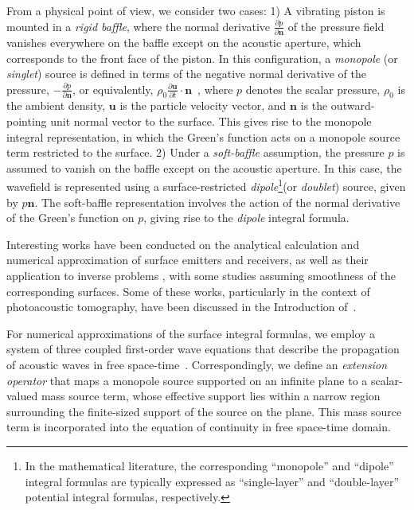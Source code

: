 \documentclass[11pt,reqno]{amsart}
\theoremstyle{remark}
\theoremstyle{italic_lemma}
\newcommand{\bu}{\boldsymbol{u}}
\newcommand{\bn}{\boldsymbol{n}}
\begin{document}
From a physical point of view, we consider two cases: 1) A vibrating piston is mounted in a \textit{rigid baffle}, where the normal derivative \( \frac{\partial p}{\partial \bn} \) of the pressure field vanishes everywhere on the baffle except on the acoustic aperture, which corresponds to the front face of the piston. In this configuration, a \textit{monopole} (or \textit{singlet}) source is defined in terms of the negative normal derivative of the pressure, \( -\frac{\partial p}{\partial \bn} \), or equivalently, \( \rho_0 \frac{\partial \bu}{\partial t} \cdot \bn \)~\cite{Li2}, where \( p \) denotes the scalar pressure, \( \rho_0 \) is the ambient density, \( \bu \) is the particle velocity vector, and \( \bn \) is the outward-pointing unit normal vector to the surface. This gives rise to the monopole integral representation, in which the Green’s function acts on a monopole source term restricted to the surface. 2) Under a \textit{soft-baffle} assumption, the pressure \( p \) is assumed to vanish on the baffle except on the acoustic aperture. In this case, the wavefield is represented using a surface-restricted \textit{dipole}\footnote{In the mathematical literature, the corresponding ``monopole'' and ``dipole'' integral formulas are typically expressed as ``single-layer'' and ``double-layer'' potential integral formulas, respectively.}(or \textit{doublet}) source, given by \( p \bn \). The soft-baffle representation involves the action of the normal derivative of the Green's function on \( p \), giving rise to the \textit{dipole} integral formula.

Interesting works have been conducted on the analytical calculation and numerical approximation of surface emitters and receivers, as well as their application to inverse problems \cite{Kostli,Finch,Xu,Burgholzer1,Burgholzer2,Cakoni,Stefanov,
Hristova,Ammari,Qian,Bao,Kunyanski,Dean-Ben,Huang,Haltmeier1,Belhachmi,Nguyen,Datchev,Ammari,Haltmeier2,Do,Uhlmann,Kuchment}, with some studies assuming smoothness of the corresponding surfaces. Some of these works, particularly in the context of photoacoustic tomography, have been discussed in the Introduction of~\cite{Javaherian10}.


For numerical approximations of the surface integral formulas, we employ a system of three coupled first-order wave equations that describe the propagation of acoustic waves in free space-time~\cite{Mast,Tabei}. Correspondingly, we define an \emph{extension operator} that maps a monopole source supported on an infinite plane to a scalar-valued mass source term, whose effective support lies within a narrow region surrounding the finite-sized support of the source on the plane. This mass source term is incorporated into the equation of continuity in free space-time domain.
\end{document}
